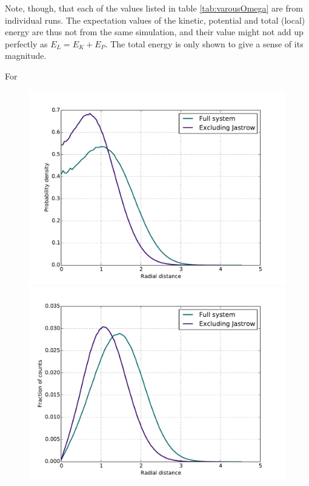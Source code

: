 \documentclass[english, a4paper]{article}
\begin{document}
	Note, though, that each of the values listed in table \ref{tab:varousOmega} are from individual runs.
	The expectation values of the kinetic, potential and total (local) energy are thus not from the same simulation, and their value might not add up perfectly as $E_L = E_K + E_P$.
	The total energy is only shown to give a sense of its magnitude.
	
	
	For 
	
	
	
	\begin{figure}
		\centering
		{\includegraphics[scale=0.43]{figures/radialDistribution/OneBodyDensityN2w100Se7.pdf}}
		{\includegraphics[scale=0.43]{figures/radialDistribution/radialDistributionN2w100Se7.pdf}}
		

\end{figure}
\end{document}

